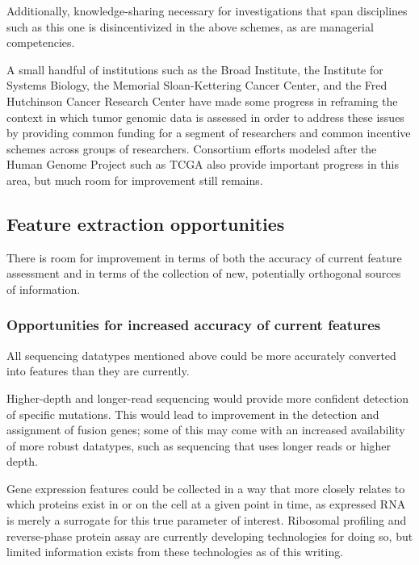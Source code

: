 Additionally, knowledge-sharing necessary for investigations that span disciplines such as this one is disincentivized in the above schemes, as are managerial competencies. 

A small handful of institutions such as the Broad Institute, the Institute for Systems Biology, the Memorial Sloan-Kettering Cancer Center, and the Fred Hutchinson Cancer Research Center have made some progress in reframing the context in which tumor genomic data is assessed in order to address these issues by providing common funding for a segment of researchers and common incentive schemes across groups of researchers. Consortium efforts modeled after the Human Genome Project\cite{lander_initial_2001} such as TCGA also provide important progress in this area, but much room for improvement still remains. 

\subsection{Feature extraction opportunities}

There is room for improvement in terms of both the accuracy of current feature
assessment and in terms of the collection of new, potentially orthogonal sources of information.

\subsubsection{Opportunities for increased accuracy of current features}

All sequencing datatypes mentioned above could be more accurately converted into features than they are currently. 

Higher-depth and longer-read sequencing would provide more confident detection of specific mutations.  This would lead to improvement in the detection and assignment of fusion genes; some of this may come with an increased availability of more robust datatypes, such as sequencing that uses longer reads or higher depth. 

Gene expression features could be collected in a way that more closely relates to which proteins exist in or on the cell at a given point in time, as expressed RNA is merely a surrogate for this true parameter of interest. Ribosomal profiling\cite{ingolia_genome-wide_2009} and reverse-phase protein assay\cite{tibes_reverse_2006} are currently developing technologies for doing so, but limited information exists from these technologies as of this writing. 


